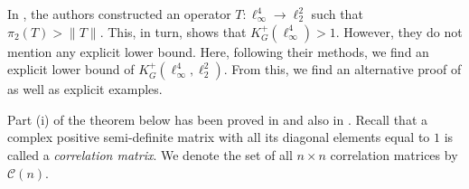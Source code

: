 \documentclass[a4paper,oneside,11pt, reqno]{amsart}
\numberwithin{equation}{section}
\theoremstyle{plain}
\begin{document}
In \cite{AFHS95}, the authors constructed an operator $T:\ell_\infty^4\to \ell_2^2$ such that $\pi_2(T)>\|T\|.$ This, in turn, shows that $K^+_G(\ell_\infty^4)>1$.
However, they do not mention any explicit lower bound.  Here, following their methods, we find an explicit lower bound of $K_G^{+}(\ell_\infty^4,\ell_2^2).$ From this, we find an alternative proof of \cite[Theorem 2.1] {Davidchoi}  as well as explicit examples. 

Part (i) of the theorem below has been proved in \cite{AFHS95} and also in \cite{BM}. 
Recall that a complex positive semi-definite matrix with all its diagonal elements equal to $1$ is called a \textit{correlation matrix}. We denote the set of all $n\times n$ correlation matrices by $\mathcal{C}(n)$.
\end{document}
